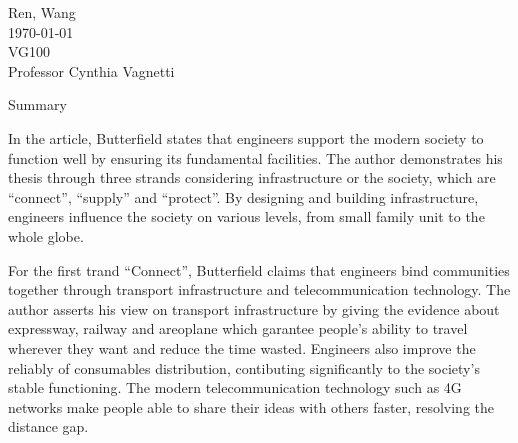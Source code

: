 \documentclass[12pt,a4]{article}
\begin{document}
\begin{flushleft}
Ren, Wang\\
\today\\
VG100\\
Professor Cynthia Vagnetti \\
\end{flushleft}

\begin{center}
Summary
\end{center}


In the article, Butterfield \cite{but} states that engineers support the modern
society to function well by ensuring its fundamental facilities. 
The author demonstrates his thesis through three strands considering
infrastructure or the society, which are ``connect'', ``supply'' and
``protect''. 
By designing and building infrastructure, engineers influence the society on
various levels, from small family unit to the whole globe.  


For the first trand ``Connect'', Butterfield claims that engineers bind
communities together through transport infrastructure and telecommunication
technology. The author asserts his view on transport infrastructure by giving
the evidence about expressway, railway and areoplane which garantee people's
ability to travel wherever they want and reduce the time wasted. Engineers also
improve the reliably of consumables distribution, contibuting significantly to
the society's stable functioning. The modern telecommunication technology such
as 4G networks make people able to share their ideas with others faster,
resolving the distance gap.





\end{document}
